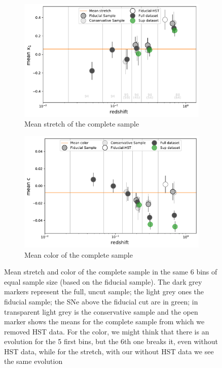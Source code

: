 \documentclass[11pt,a4paper]{paper}
\begin{document}
\begin{figure}[htbp!]
    \centering
    \begin{subfigure}[t]{0.70\linewidth}
        \centering
        \includegraphics[width=\linewidth]{Answer_figures/mean_stretchs-nHST_full-sup.pdf}
        \captionsetup{justification=centering}
        \caption{Mean stretch of the complete sample}
        \label{fig:mean_x}
    \end{subfigure}
    \begin{subfigure}[t]{0.70\linewidth}
        \centering
        \includegraphics[width=\linewidth]{Answer_figures/mean_colors-nHST_full-sup.pdf}
        \captionsetup{justification=centering}
        \caption{Mean color of the complete sample}
        \label{fig:mean_c}
    \end{subfigure}
    \centering
    \captionsetup{justification=centering}

    \caption{Mean stretch and color of the complete sample in the same 6 bins of
        equal sample size (based on the fiducial sample). The dark grey markers
        represent the full, uncut sample; the light grey ones the fiducial
        sample; the SNe above the fiducial cut are in green; in transparent
        light grey is the conservative sample and the open marker shows the
        means for the complete sample from which we removed HST data. For the
        color, we might think that there is an evolution for the 5 first bins,
        but the 6th one breaks it, even without HST data, while for the stretch,
    with our without HST data we see the same evolution}

    \label{fig:means}
\end{figure}
\end{document}
